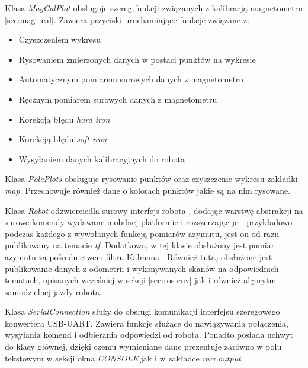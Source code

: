 Klasa \emph{MagCalPlot} obsługuje szereg funkcji związanych z kalibracją magnetometru \ref{sec:mag_cal}. Zawiera przyciski uruchamiające funkcje związane z:
\begin{itemize}
    \item Czyszczeniem wykresu
    \item Rysowaniem zmierzonych danych w postaci punktów na wykresie
    \item Automatycznym pomiarem surowych danych z magnetometru
    \item Ręcznym pomiarem surowych danych z magnetometru
    \item Korekcją błędu \emph{hard iron} \cite{hard-iron} \cite{hard-soft-iron}
    \item Korekcją błędu \emph{soft iron} \cite{hard-soft-iron}
    \item Wysyłaniem danych kalibracyjnych do robota
\end{itemize}

Klasa \emph{PolePlots} obsługuje rysowanie punktów oraz czyszczenie wykresu zakładki \emph{map}. Przechowuje również dane o kolorach punktów jakie są na nim rysowane.

Klasa \emph{Robot} odzwierciedla surowy interfejs robota \label{sec:firmware}, dodając warstwę abstrakcji na surowe komendy wydawane mobilnej platformie i rozszerzając je - przykładowo podczas każdego z wywołanych funkcją pomiarów azymutu, jest on od razu publikowany na temacie \emph{tf}. Dodatkowo, w tej klasie obsłużony jest pomiar azymutu za pośrednictwem filtru Kalmana \cite{Kedzierski2016}. Również tutaj obsłużone jest publikowanie danych z odometrii i wykonywanych skanów na odpowiednich tematach, opisanych wcześniej w sekcji \ref{sec:ros-env} jak i również algorytm samodzielnej jazdy robota.

Klasa \emph{SerialConnection} służy do obsługi komunikacji interfejsu szeregowego konwertera USB-UART. Zawiera funkcje służące do nawiązywania połączenia, wysyłania komend i odbierania odpowiedzi od robota. Ponadto posiada uchwyt do klasy głównej, dzięki czemu wymieniane dane prezentuje zarówno w polu tekstowym w sekcji okna \emph{CONSOLE} jak i w zakładce \emph{raw output}.

